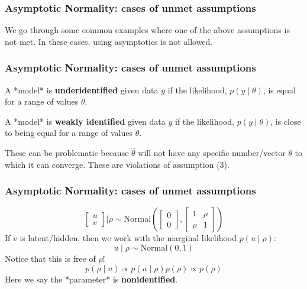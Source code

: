 \documentclass{beamer}
\begin{document}
\begin{frame}
\frametitle{Asymptotic Normality: cases of unmet assumptions}

We go through some common examples where one of the above assumptions is not met. In these cases, using asymptotics is not allowed.

\end{frame}



\begin{frame}
\frametitle{Asymptotic Normality: cases of unmet assumptions}

A *model* is {\bf underidentified} given data $y$ if the likelihood, $p(y \mid \theta)$, is equal for a range of values $\theta$. 
\newline

A *model* is {\bf weakly identified} given data $y$ if the likelihood, $p(y \mid \theta)$, is close to being equal for a range of values $\theta$. 
\newline

These can be problematic because $\hat{\theta}$ will not have any specific number/vector $\theta$ to which it can converge. These are violations of assumption (3).

\end{frame}

\begin{frame}
\frametitle{Asymptotic Normality: cases of unmet assumptions}

\[
\left[\begin{array}{c}
u \\
v
\end{array}\right]
\bigg|
\rho
\sim
\text{Normal}\left( 
\left[\begin{array}{c}
0 \\
0
\end{array}\right]
,
\left[\begin{array}{cc}
1 & \rho \\
\rho & 1
\end{array}\right]
\right)
\]
If $v$ is latent/hidden, then we work with the marginal likelihood $p(u \mid \rho)$:
\[
u \mid \rho \sim \text{Normal}\left(0, 1 \right)
\]
Notice that this is free of $\rho$! 
\[
p(\rho \mid u) \propto p(u \mid \rho) p(\rho) \propto p(\rho)
\]
Here we say the *parameter* is {\bf nonidentified}.

\end{frame}
\end{document}
